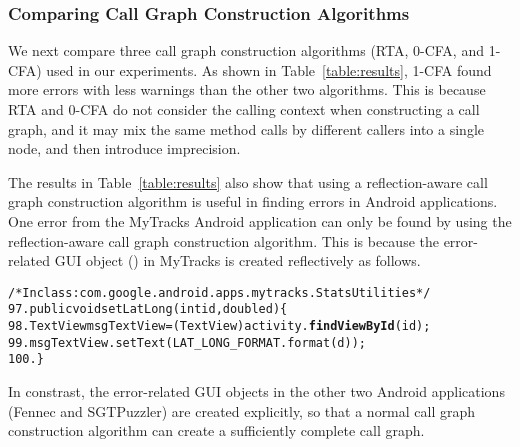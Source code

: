 \subsubsection{Comparing Call Graph Construction Algorithms}
\label{sec:reflectionaware}

We next compare three call graph construction algorithms (RTA, 0-CFA, and 1-CFA)
used in our experiments. As shown in Table~\ref{table:results},  1-CFA found
more errors with less warnings than the other two algorithms. This
is because RTA and 0-CFA do not consider the calling context when
constructing a call graph, and it may
mix the same method calls by different callers into a single node, and
then introduce imprecision. 


The results in Table~\ref{table:results} also show that using a reflection-aware
call graph construction algorithm is useful in finding errors in Android
applications. One error from the MyTracks Android application
can only be found by using the reflection-aware call graph construction algorithm.
This is because the error-related GUI object () in MyTracks is created
reflectively as follows.

\begin{CodeOut}
\begin{alltt}
/*In class: com.google.android.apps.mytracks.StatsUtilities*/
97.  public void setLatLong(int id, double d) \{
98.     TextView msgTextView = (TextView) activity.\textbf{findViewById}(id);
99.     msgTextView.setText(LAT\_LONG\_FORMAT.format(d));
100.\}
\end{alltt}
\end{CodeOut}
 
In constrast, the error-related GUI objects in the other two Android applications (Fennec
and SGTPuzzler) are created explicitly, so that a normal call graph construction
algorithm can create a sufficiently complete call graph.


\vspace{1mm}

